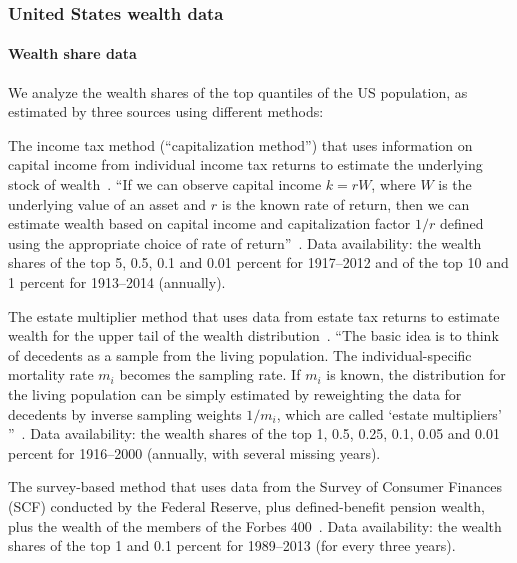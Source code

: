 
\subsubsection{United States wealth data}

\paragraph{Wealth share data}

We analyze the wealth shares of the top quantiles of the US population, as estimated by three sources using different methods:

\bi
\item
The income tax method (``capitalization method'') that uses information on capital income from individual income tax returns to estimate the underlying stock of wealth~\cite{SaezZucman2014,WID2017}. ``If we can observe capital income $k = rW$, where $W$ is the underlying value of an asset and $r$ is the known rate of return, then we can estimate wealth based on capital income and capitalization factor $1/r$ defined using the appropriate choice of rate of return''~\cite[p.~54] {kopczuk2015we}. Data availability: the wealth shares of the top 5, 0.5, 0.1 and 0.01 percent for 1917--2012 and of the top 10 and 1 percent for 1913--2014 (annually).
\item
The estate multiplier method that uses data from estate tax returns to estimate wealth for the upper tail of the wealth distribution~\cite{kopczuk2004top}. ``The basic idea is to think of decedents as a sample from the living population. The individual-specific mortality rate $m_i$ becomes the sampling rate. If $m_i$ is known, the distribution for the living population can be simply estimated by reweighting the data for decedents by inverse sampling weights $1/m_i$, which are called `estate multipliers' ''~\cite[p.~53] {kopczuk2015we}. Data availability: the wealth shares of the top 1, 0.5, 0.25, 0.1, 0.05 and 0.01 percent for 1916--2000 (annually, with several missing years).
\item
The survey-based method that uses data from the Survey of Consumer Finances (SCF) conducted by the Federal Reserve, plus defined-benefit pension wealth, plus the wealth of the members of the Forbes 400~\cite{bricker2016measuring2}. Data availability: the wealth shares of the top 1 and 0.1 percent for 1989--2013 (for every three years).
\ei

